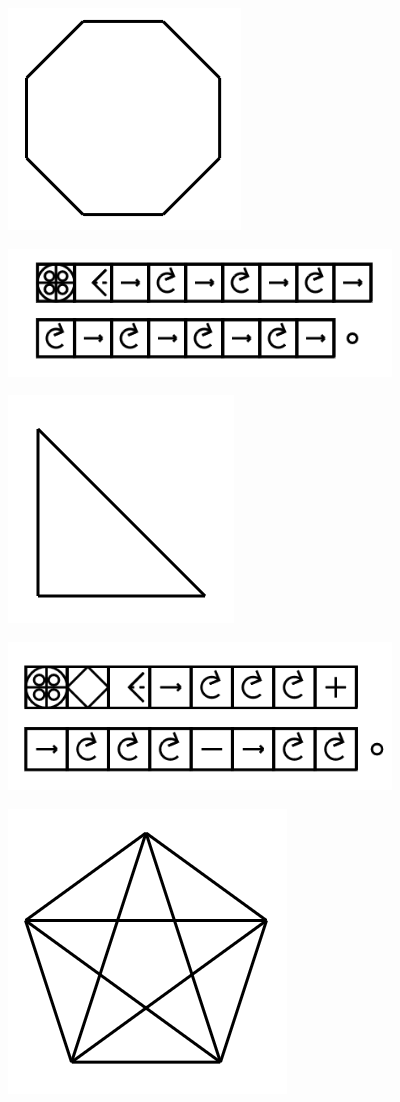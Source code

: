 \documentclass[11pt]{article}
\begin{document}
\includegraphics{image12.png}

\includegraphics[width=4in]{image13.png}







\includegraphics{image14.png}

\includegraphics[width=4in]{image15.png}







\includegraphics{image16.png}
\end{document}

